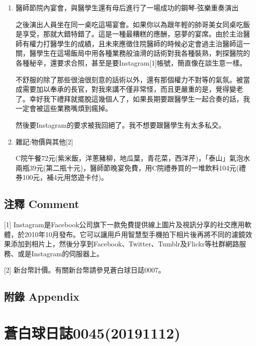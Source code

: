 \documentclass[a5paper, 12pt
]{book}
\begin{document}
\begin{enumerate}
\def\labelenumi{\arabic{enumi}.}
\item
  醫師節院內宴會，與醫學生還有母后進行了一場成功的鋼琴-弦樂重奏演出

  之後演出人員坐在同一桌吃這場宴會。如果你以為跟年輕的帥哥美女同桌吃飯是享受，那就大錯特錯了。這是一種最糟糕的應酬，惡夢的宴席。由於主治醫師有權力打醫學生的成績，且未來應徵住院醫師的時候必定會過主治醫師這一關，醫學生在這場飯局中用各種業務般油滑的話術對我各種裝熟，刺探醫院的各種秘辛，還要求合照，甚至是要Instagram{[}1{]}帳號，簡直像在談生意一樣。

  不舒服的除了那些很油很刻意的話術以外，還有那個權力不對等的氣氛。被當成需要加以奉承的長官，對我來講不僅非常怪，而且更嚴重的是，覺得變老了。幸好我下禮拜就擺脫這幾個人了，如果長期要跟醫學生一起合奏的話，我一定會被這些業務嘴煩到瘋掉。

  然後要Instagram的要求被我回絕了。我不想要跟醫學生有太多私交。
\item
  雜記:物價與其他{[}2{]}

  C院午餐72元(紫米飯，洋蔥豬柳，地瓜葉，青花菜，西洋芹)，「泰山」氣泡水兩瓶39元(第二瓶十元)，醫師節晚宴免費，用C院禮券買的一堆飲料104元(禮券100元，補4元用悠遊卡付)。
\end{enumerate}

\hypertarget{ux6ce8ux91cb-comment-37}{%
\subsection{注釋 Comment}\label{ux6ce8ux91cb-comment-37}}

{[}1{]}
Instagram是Facebook公司旗下一款免費提供線上圖片及視訊分享的社交應用軟體，於2010年10月發布。它可以讓用戶用智慧型手機拍下相片後再將不同的濾鏡效果添加到相片上，然後分享到Facebook、Twitter、Tumblr及Flickr等社群網路服務、或是Instagram的伺服器上。

{[}2{]} 新台幣計價。有關新台幣請參見蒼白球日誌0007。

\hypertarget{ux9644ux9304-appendix-36}{%
\subsection{附錄 Appendix}\label{ux9644ux9304-appendix-36}}

\hypertarget{ux84bcux767dux7403ux65e5ux8a8c004520191112}{%
\section{蒼白球日誌0045(20191112)}\label{ux84bcux767dux7403ux65e5ux8a8c004520191112}}
\end{document}

